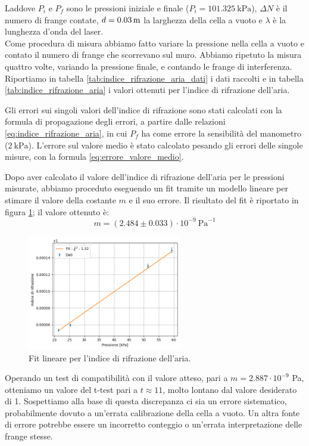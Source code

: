 \documentclass[letterpaper,12pt]{article}
\begin{document}
Laddove $P_i$ e $P_f$ sono le pressioni iniziale e finale ($P_i = \SI{101.325}{\kilo\pascal}$), $\Delta N$ 
è il numero di frange contate, $d = \SI{0.03 \pm 0}{m}$ la larghezza della cella a vuoto e $\lambda$ è la 
lunghezza d'onda del laser.\\
Come procedura di misura abbiamo fatto variare la pressione nella cella a vuoto e contato il numero di frange che scorrevano
sul muro. Abbiamo ripetuto la misura quattro volte, variando la pressione finale, e contando le 
frange di interferenza. Riportiamo in tabella \ref{tab:indice_rifrazione_aria_dati} i dati raccolti e in tabella 
\ref{tab:indice_rifrazione_aria} i valori ottenuti per l'indice di rifrazione dell'aria. 


Gli errori sui singoli valori dell'indice di rifrazione sono stati calcolati con la formula di propagazione degli errori,
a partire dalle relazioni \eqref{eq:indice_rifrazione_aria}, in cui $P_f$ ha come errore la sensibilità del manometro 
($\SI{2}{\kilo\pascal}$). L'errore sul valore medio è stato calcolato pesando gli errori delle singole misure, con la 
formula \eqref{eq:errore_valore_medio}.

Dopo aver calcolato il valore dell'indice di rifrazione dell'aria per le pressioni misurate, abbiamo proceduto eseguendo un fit tramite
un modello lineare per stimare il valore della costante $m$ e il suo errore. Il risultato del fit è riportato in figura \ref{fig:m_aria};
il valore ottenuto è:
$$m = (2.484 ± 0.033)\cdot 10^{-9} \ \text{Pa}^{-1}$$

\begin{figure}[h!]
    \centering
    \includegraphics[width=0.6\textwidth]{fit_m_aria.png}
    \caption{Fit lineare per l'indice di rifrazione dell'aria.}
    \label{fig:m_aria}
\end{figure}

Operando un test di compatibilità con il valore atteso, pari a $m = 2.887 \cdot 10^{-9}$ Pa, otteniamo un valore del
t-test pari a $t \approx 11$, molto lontano dal valore desiderato di 1.
Sospettiamo alla base di questa discrepanza ci sia un errore sistematico, probabilmente dovuto a un'errata calibrazione
della cella a vuoto.
Un altra fonte di errore potrebbe essere un incorretto conteggio o un'errata interpretazione delle frange stesse.\\
\end{document}
